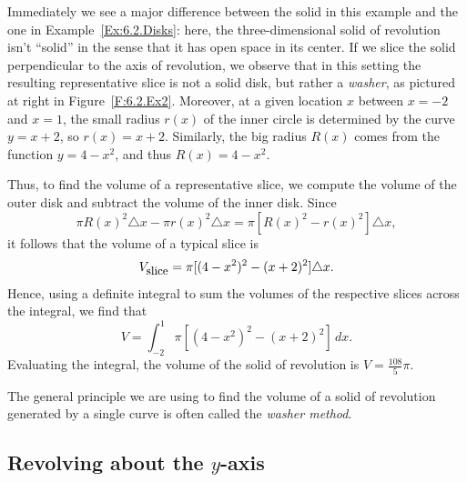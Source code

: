 Immediately we see a major difference between the solid in this example and the one in Example~\ref{Ex:6.2.Disks}:  here, the three-dimensional solid of revolution isn't ``solid'' in the sense that it has open space in its center.  If we slice the solid perpendicular to the axis of revolution, we observe that in this setting the resulting representative slice is not a solid disk, but rather a \emph{washer}, as pictured at right in Figure~\ref{F:6.2.Ex2}.  Moreover, at a given location $x$ between $x = -2$ and $x = 1$, the small radius $r(x)$ of the inner circle is determined by the curve $y = x+2$, so $r(x) = x+2$.  Similarly, the big radius $R(x)$ comes from the function $y = 4-x^2$, and thus $R(x) = 4-x^2$.

Thus, to find the volume of a representative slice, we compute the volume of the outer disk and subtract the volume of the inner disk.  Since
$$\pi R(x)^2 \triangle x - \pi r(x)^2 \triangle x = \pi [ R(x)^2 - r(x)^2] \triangle x,$$
it follows that the volume of a typical slice is
$$V_{\text{\small{slice}}} = \pi [ (4-x^2)^2 - (x+2)^2 ] \triangle x.$$
Hence, using a definite integral to sum the volumes of the respective slices across the integral, we find that
$$V = \int_{-2}^1 \pi[ (4-x^2)^2 - (x+2)^2 ] \, dx.$$
Evaluating the integral, the volume of the solid of revolution is $V = \frac{108}{5}\pi$.

\afterex

The general principle we are using to find the volume of a solid of revolution generated by a single curve is often called the \emph{washer method}.

\vspace*{5pt}
\nin {}
\vspace*{1pt}



\subsection*{Revolving about the $y$-axis}

